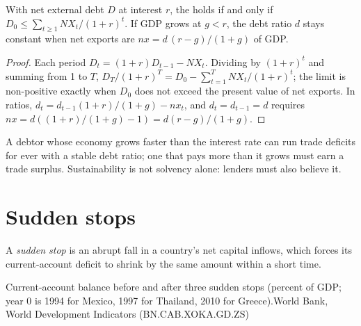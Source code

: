 \begin{proposition}\label{prop:b3:current-account:sustainable}
With net external debt $D$ at interest $r$, the  holds if and only
if $D_0 \le \sum_{t \ge 1} NX_t/(1 + r)^t$. If GDP grows at $g < r$, the debt ratio $d$ stays
constant when net exports are $nx = d\,(r - g)/(1 + g)$ of GDP.
\end{proposition}

\begin{proof}
Each period $D_t = (1 + r)D_{t-1} - NX_t$. Dividing by $(1 + r)^t$ and summing from 1 to
$T$, $D_T/(1 + r)^T = D_0 - \sum_{t=1}^T NX_t/(1 + r)^t$; the limit is non-positive exactly when
$D_0$ does not exceed the present value of net exports. In ratios, $d_t = d_{t-1}(1 +
r)/(1 + g) - nx_t$, and $d_t = d_{t-1} = d$ requires $nx = d((1 + r)/(1 + g) - 1) = d(r - g)/(1 + g)$.
\end{proof}

A debtor whose economy grows faster than the interest rate can run trade deficits
for ever with a stable debt ratio; one that pays more than it grows must earn a
trade surplus. Sustainability is not solvency alone: lenders must also believe it.

\section{Sudden stops}\label{sec:b3:current-account:sudden}

\begin{definition}\label{def:b3:current-account:sudden-stop}
A \emph{sudden stop} is an abrupt fall in a country's net capital inflows, which
forces its current-account deficit to shrink by the same amount within a short
time.
\end{definition}

\begin{omchart}{Current-account balance before and after three sudden stops
(percent of GDP; year 0 is 1994 for Mexico, 1997 for Thailand, 2010 for
Greece).}{World Bank, World Development Indicators (BN.CAB.XOKA.GD.ZS)}
\end{omchart}

